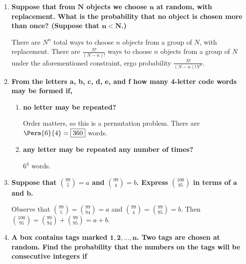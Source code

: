 \documentclass[10pt, oneside]{article}
\begin{document}
\begin{enumerate}[label=2.\arabic*]
\begin{enumerate}
	\end{enumerate}
\item \begin{tcolorbox}[
  colback=Cerulean!5!white,
  colframe=Cerulean!75!black]
  \textbf{Suppose that from $\bm{N}$ objects we choose $\bm{n}$ at random, with replacement. What is the probability that no object is chosen more than once? (Suppose that $\bm{n < N}$.)}
  \end{tcolorbox}
  
  There are $N^n$ total ways to choose $n$ objects from a group of $N$, with replacement. There are $\frac{N!}{(N-n)!}$ ways to choose $n$ objects from a group of $N$ under the aforementioned constraint, ergo probability $\boxed{ \frac{N!}{(N-n)! N^n }} $.
\item \begin{tcolorbox}[
  colback=Cerulean!5!white,
  colframe=Cerulean!75!black]
  \textbf{From the letters a, b, c, d, e, and f how many 4-letter code words may be formed if,}
  \end{tcolorbox}
  
  	\begin{enumerate}
	\item \begin{tcolorbox}[
  colback=Cerulean!5!white,
  colframe=Cerulean!75!black]
  \textbf{no letter may be repeated?}
  \end{tcolorbox}
  
  Order matters, so this is a permutation problem. There are $\Perm{6}{4} = \boxed{360}$ words.
  	\item \begin{tcolorbox}[
  colback=Cerulean!5!white,
  colframe=Cerulean!75!black]
  \textbf{any letter may be repeated any number of times?}
  \end{tcolorbox}
  
  $\boxed{6^4}$ words.
	\end{enumerate}
\item \begin{tcolorbox}[
  colback=Cerulean!5!white,
  colframe=Cerulean!75!black]
  \textbf{Suppose that $\binom{99}{5} = a$ and $ \binom{99}{4} = b$. Express $\binom{100}{95} $ in terms of $\bm{a}$ and $\bm{b}$.}
  \end{tcolorbox}
  
  Observe that $\binom{99}{5} = \binom{99}{94} = a$ and $\binom{99}{4} = \binom{99}{95} = b$. Then $\binom{100}{95} = \binom{99}{94} + \binom{99}{95} = \boxed{a + b}$.
\item \begin{tcolorbox}[
  colback=Cerulean!5!white,
  colframe=Cerulean!75!black]
  \textbf{A box contains tags marked $\bm{1, 2, ..., n}$. Two tags are chosen at random. Find the probability that the numbers on the tags will be consecutive integers if}
  \end{tcolorbox}
  

\end{enumerate}
\end{document}
